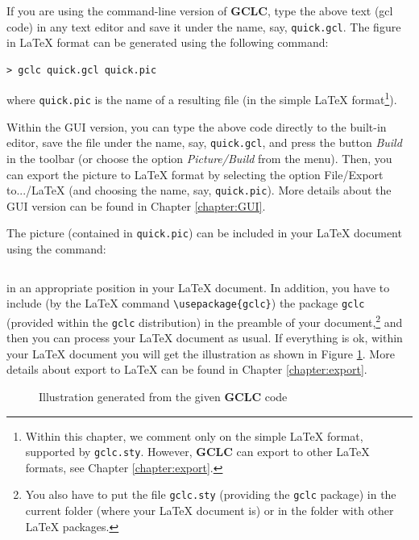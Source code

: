 \documentclass[a4paper]{book}
\newcommand{\gclc}{{\bfseries GCLC}\xspace}
\begin{document}
If you are using the command-line version of \gclc{}, type the above
text ({\sc gcl} code) in any text editor and save it under the name,
say, \verb|quick.gcl|. The figure in \LaTeX{} format can be generated
using the following command:

\begin{verbatim}
> gclc quick.gcl quick.pic
\end{verbatim}

\noindent
where \verb|quick.pic| is the name of a resulting file (in the simple
\LaTeX{} format\footnote{
Within this chapter, we comment only on the simple \LaTeX{}
format, supported by {\tt gclc.sty}. However, \gclc can export
to other \LaTeX{} formats, see Chapter \ref{chapter:export}.}).

Within the GUI version, you can type the above code directly to the built-in
editor, save the file under the name, say, \verb|quick.gcl|, and press
the button {\it Build} in the toolbar (or choose the option {\it Picture/Build}
from the menu).
Then, you can export the picture to \LaTeX{} format by selecting the option 
File/Export to.../LaTeX (and choosing the name, say, \verb|quick.pic|).
More details about the GUI version can be found in Chapter \ref{chapter:GUI}.

The picture (contained in \verb|quick.pic|) can be included in
your \LaTeX{} document using the command:

\begin{verbatim}

\end{verbatim}

\noindent
in an appropriate position in your \LaTeX{} document. In addition,
you have to include
(by the \LaTeX{} command \verb|\usepackage{gclc}|) the package
\verb|gclc| (provided within the \verb|gclc| distribution) in the
preamble of your document,\footnote{You also have to put the file
{\tt gclc.sty} (providing the {\tt gclc} package) in the current
folder (where your \LaTeX{} document is) or in the folder with other
\LaTeX{} packages.}
and then you can process your \LaTeX{} document as usual.
If everything is ok, within your \LaTeX{} document you will get the 
illustration as shown in Figure \ref{fig:quick}. More details about 
export to \LaTeX{} can be found in Chapter \ref{chapter:export}.

\begin{figure}[ht]
\framebox[122mm][l]
{
\begin{minipage}[t]{120mm}

\end{minipage}
}
\caption{Illustration generated from the given \gclc{} code}
\label{fig:quick}
\end{figure}
\end{document}
